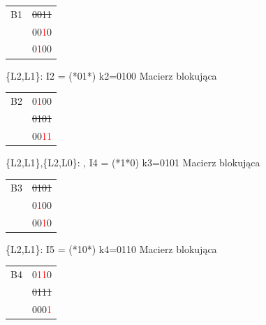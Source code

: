 \documentclass[]{article}
\begin{document}
\newline
\begin{tabular}[r]{|c|c|}
\hline
    B1 & \sout{0011}  \\
      & 00\textcolor{red}{1}0 \\
      & 0\textcolor{red}{1}00 \\
 \hline 
\end{tabular}
\newline
\newline
\{L2,L1\}: I2 = (*01*)
\newline
\newline
k2=0100
\newline
Macierz blokująca
\newline
\begin{tabular}[r]{|c|c|}
\hline
    B2 & 0\textcolor{red}{1}00   \\
      & \sout{0101} \\
      & 00\textcolor{red}{1}\textcolor{red}{1} \\
 \hline 
\end{tabular}
\newline
\newline
\{L2,L1\},\{L2,L0\}: , I4 = (*1*0)
\newline
\newline
k3=0101
\newline
Macierz blokująca
\newline
\begin{tabular}[r]{|c|c|}
\hline
    B3 & \sout{0101}  \\
      & 0\textcolor{red}{1}00 \\
      & 00\textcolor{red}{1}0 \\
 \hline 
\end{tabular}
\newline
\newline
\{L2,L1\}: I5 = (*10*)
\newline
\newline
k4=0110
\newline
Macierz blokująca
\newline
\begin{tabular}[r]{|c|c|}
\hline
    B4 & 0\textcolor{red}{1}\textcolor{red}{1}0  \\
      & \sout{0111} \\
      & 000\textcolor{red}{1} \\
 \hline 
\end{tabular}
\newline
\newline
\end{document}

